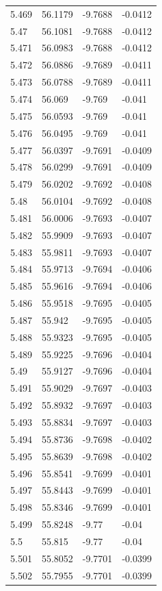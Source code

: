 \begin{tabular}{llll}
5.469 & 56.1179 & -9.7688 & -0.0412 \\
5.47 & 56.1081 & -9.7688 & -0.0412 \\
5.471 & 56.0983 & -9.7688 & -0.0412 \\
5.472 & 56.0886 & -9.7689 & -0.0411 \\
5.473 & 56.0788 & -9.7689 & -0.0411 \\
5.474 & 56.069 & -9.769 & -0.041 \\
5.475 & 56.0593 & -9.769 & -0.041 \\
5.476 & 56.0495 & -9.769 & -0.041 \\
5.477 & 56.0397 & -9.7691 & -0.0409 \\
5.478 & 56.0299 & -9.7691 & -0.0409 \\
5.479 & 56.0202 & -9.7692 & -0.0408 \\
5.48 & 56.0104 & -9.7692 & -0.0408 \\
5.481 & 56.0006 & -9.7693 & -0.0407 \\
5.482 & 55.9909 & -9.7693 & -0.0407 \\
5.483 & 55.9811 & -9.7693 & -0.0407 \\
5.484 & 55.9713 & -9.7694 & -0.0406 \\
5.485 & 55.9616 & -9.7694 & -0.0406 \\
5.486 & 55.9518 & -9.7695 & -0.0405 \\
5.487 & 55.942 & -9.7695 & -0.0405 \\
5.488 & 55.9323 & -9.7695 & -0.0405 \\
5.489 & 55.9225 & -9.7696 & -0.0404 \\
5.49 & 55.9127 & -9.7696 & -0.0404 \\
5.491 & 55.9029 & -9.7697 & -0.0403 \\
5.492 & 55.8932 & -9.7697 & -0.0403 \\
5.493 & 55.8834 & -9.7697 & -0.0403 \\
5.494 & 55.8736 & -9.7698 & -0.0402 \\
5.495 & 55.8639 & -9.7698 & -0.0402 \\
5.496 & 55.8541 & -9.7699 & -0.0401 \\
5.497 & 55.8443 & -9.7699 & -0.0401 \\
5.498 & 55.8346 & -9.7699 & -0.0401 \\
5.499 & 55.8248 & -9.77 & -0.04 \\
5.5 & 55.815 & -9.77 & -0.04 \\
5.501 & 55.8052 & -9.7701 & -0.0399 \\
5.502 & 55.7955 & -9.7701 & -0.0399 \\

\end{tabular}
